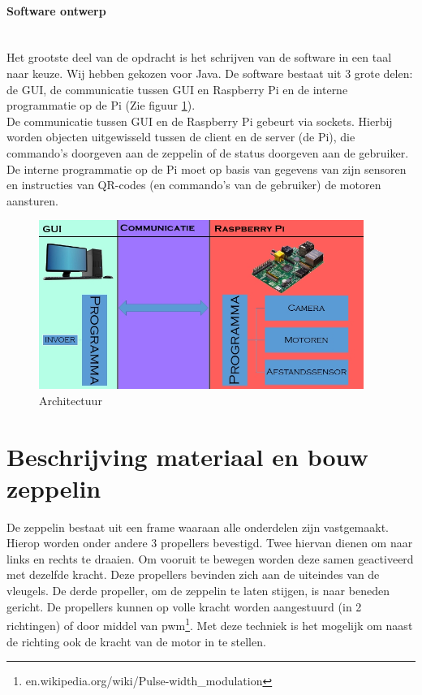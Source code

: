\documentclass[eind]{penoverslag}
\begin{document}
\paragraph{Software ontwerp}
~\\
Het grootste deel van de opdracht is het schrijven van de software in een taal naar keuze. Wij hebben gekozen voor Java. De software bestaat uit 3 grote delen: de GUI, de communicatie tussen GUI en Raspberry Pi en de interne programmatie op de Pi (Zie figuur \ref{schema}). \\
De communicatie tussen GUI en de Raspberry Pi gebeurt via sockets. Hierbij worden objecten uitgewisseld tussen de client en de server (de Pi), die commando's doorgeven aan de zeppelin of de status doorgeven aan de gebruiker. De interne programmatie op de Pi moet op basis van gegevens van zijn sensoren en instructies van QR-codes (en commando's van de gebruiker) de motoren aansturen. 

\begin{figure}[ht!]
\centering
\includegraphics[height=55mm]{Schema.jpg}
\caption{Architectuur}
\label{schema}
\end{figure}


\section{Beschrijving materiaal en bouw zeppelin}
De zeppelin bestaat uit een frame waaraan alle onderdelen zijn vastgemaakt. Hierop worden onder andere 3 propellers bevestigd. Twee hiervan dienen om naar links en rechts te draaien. Om vooruit te bewegen worden deze samen geactiveerd met dezelfde kracht. Deze propellers bevinden zich aan de uiteindes van de vleugels. De derde propeller, om de zeppelin te laten stijgen, is naar beneden gericht. De propellers kunnen op volle kracht worden aangestuurd (in 2 richtingen) of door middel van pwm\footnote{en.wikipedia.org/wiki/Pulse-width\_modulation}. Met deze techniek is het mogelijk om naast de richting ook de kracht van de motor in te stellen.~\\
\end{document}
